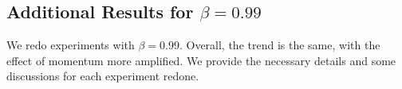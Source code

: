 


\newpage
\subsection{Additional Results for $\beta = 0.99$}
\label{app:099}
We redo experiments with $\beta = 0.99$.
Overall, the trend is the same, with the effect of momentum more amplified.
We provide the necessary details and some discussions for each experiment redone.

